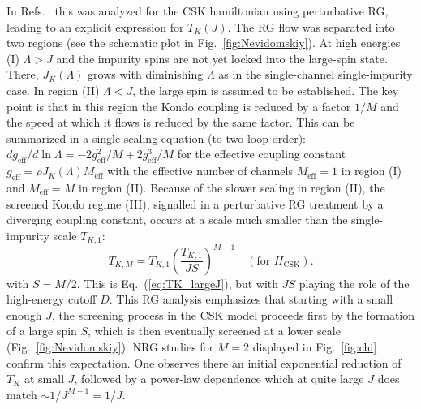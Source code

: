 \documentclass[]{ar2e-changed}%
\def\geff{g_{\mathrm{eff}}}
\begin{document}
In Refs.~\cite{jayaprakash81,nevidomskiy09} this was analyzed for the CSK hamiltonian using %
perturbative RG, leading to 
an explicit expression for $T_K(J)$. 
The RG flow was separated into two regions (see the 
schematic plot in Fig.~\ref{fig:Nevidomskiy}). At high energies (I)  
$\Lambda > J$ and the impurity spins are not yet locked into the large-spin state. 
There, $J_K(\Lambda)$ grows with diminishing $\Lambda$ as in the single-channel single-impurity case. 
%
In region (II) $\Lambda <J$, the large spin is assumed to be established. The
key point is that in this region the Kondo coupling is reduced by a
factor $1/M$ and the speed at which it flows is reduced by the same
factor.
%
This can be summarized in a single scaling equation (to two-loop order): 
$d\geff/d\ln\Lambda=-2\geff^2/M+2\geff^3/M$ %
for the effective coupling constant 
$\geff=\rho J_K(\Lambda)M_{\mathrm{eff}}$ with the effective number of channels 
$M_{\mathrm{eff}} = 1$ in region (I) and $M_{\mathrm{eff}}=M$ in region (II). 
%
Because of the slower scaling in region (II), the screened Kondo
regime (III), signalled in a perturbative RG treatment by a diverging
coupling constant, occurs at a scale much smaller than the
single-impurity scale $T_{K,1}$:
\begin{equation}
T_{K,M} =T_{K,1} \left(\frac{T_{K,1}}{J S} \right)^{M-1}\,\,\,\,\,\,(\mathrm{for}\,\,H_{\mathrm{CSK}}) %
\label{eq:nevicoleman_TK}.
\end{equation}
with $S=M/2$. This is Eq.~(\ref{eq:TK_largeJ}), but with $J S$ playing the role of the
high-energy cutoff $D$.  
This RG analysis emphasizes that starting with a small enough $J$, the screening process 
in the CSK %
model proceeds first by the formation of a large spin $S$, which is then 
eventually screened at a lower scale (Fig.~\ref{fig:Nevidomskiy}). NRG studies for 
$M=2$ displayed in Fig.~\ref{fig:chi} confirm this expectation. 
One observes there an initial exponential reduction of $T_K$ at small $J$, followed by a 
power-law dependence which at quite large $J$ does match $\sim 1/J^{M-1}=1/J$.
\end{document}
